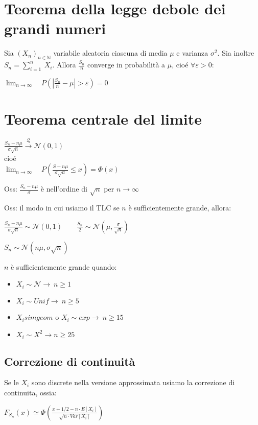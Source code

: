 \documentclass[12pt, a4paper]{article}
\begin{document}
\section{Teorema della legge debole dei grandi numeri}
Sia $(X_{n})_{n\in\mathbb{N}}$ variabile aleatoria ciascuna di media $\mu$ e  varianza $\sigma^{2}$. Sia inoltre
$S_{n}=\sum_{i=1}^{n}\ X_{i}$. Allora $\frac{S_{n}}{n}$ converge in probabilità a $\mu$, cioé $\forall\varepsilon
>0$:
\begin{center}
    $\lim_{n\to\infty}\quad P(|\frac{S_{n}}{n}-\mu|>\varepsilon)=0$
\end{center}

\section{Teorema centrale del limite}
\begin{center}
    $\frac{S_{n}-n\mu}{\sigma\sqrt{n}}\xrightarrow{\mathfrak{L}}\mathcal{N}(0,1)$\\
    cioé\\
    $\lim_{n\to\infty}\quad P(\frac{S-n\mu}{\sigma\sqrt{n}}\leq x)=\Phi(x)$
\end{center}

Oss: $\frac{S_{n}-n\mu}{\sigma}$ è nell'ordine di $\sqrt{n}$ per $n\to\infty$

Oss: il modo in cui usiamo il TLC se $n$ è sufficientemente grande, allora:
\begin{center}
    $\frac{S_{n}-n\mu}{\sigma\sqrt{n}}\sim\mathcal{N}(0,1)\qquad\frac{S_{n}}{2}\sim\mathcal{N}(\mu,
    \frac{\sigma}{\sqrt{n}})$

    $S_{n}\sim\mathcal{N}(n\mu,\sigma\sqrt{n})$
\end{center}
$n$ è sufficientemente grande quando:
\begin{itemize}
    \item $X_{i}\sim\mathcal{N}\to\ n\geq 1$
    \item $X_{i}\sim Unif\to\ n\geq 5$
    \item $X_{i}sim geom$ o $X_{i}\sim exp\to\ n\geq 15$
    \item $X_{i}\sim X^{2}\to n\geq 25$
\end{itemize}

\subsection{Correzione di continuità}
Se le $X_{i}$ sono discrete nella versione approssimata usiamo la correzione di continuita, ossia:
\begin{center}
    $F_{S_{n}}(x)\simeq\Phi\left(\frac{x+1/2-n\cdot E[X_{i}]}{\sqrt{n\cdot Var[X_{i}]}}\right)$
\end{center}
\end{document}
